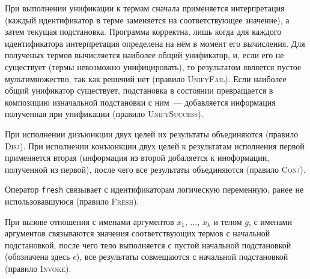     
    При выполнении унификации к термам сначала применяется интерпретация (каждый идентификатор в терме заменяется на соответствующее значение), а затем текущая подстановка. Программа корректна, лишь когда для каждого идентификатора интерпретация определена на нём в момент его вычисления. Для полученых термов вычисляется наиболее общий унификатор, и, если его не существует (термы невозможно унифицировать), то результатом является пустое мультимножество, так как решений нет (правило \textsc{UnifyFail}). Если наиболее общий унификатор существует, подстановка в состоянии превращается в композицию изначальной подстановки с ним~--- добавляется информация полученная при унификации (правило \textsc{UnifySuccess}).
    
    При исполнении дизъюнкции двух целей их результаты объединяются (правило \textsc{Disj}). При исполнении конъюнкции двух целей к результатам исполнения первой применяется вторая (информация из второй добаляется к иноформации, полученной из первой), после чего все результаты объединяются (правило \textsc{Conj}).
    
                 
    Оператор \lstinline|fresh| связывает с идентификаторам логическую переменную, ранее не использовавшуюся (правило \textsc{Fresh}).
    

    При вызове отношения с именами аргументов $x_1$, $\dots$, $x_k$ и телом $g$, с именами аргументов связываются значения соответствующих термов с начальной подстановкой, после чего тело выполняется с пустой начальной подстановкой (обозначена здесь $\epsilon$), все результаты совмещаются с начальной подстановкой (правило \textsc{Invoke}).
    

